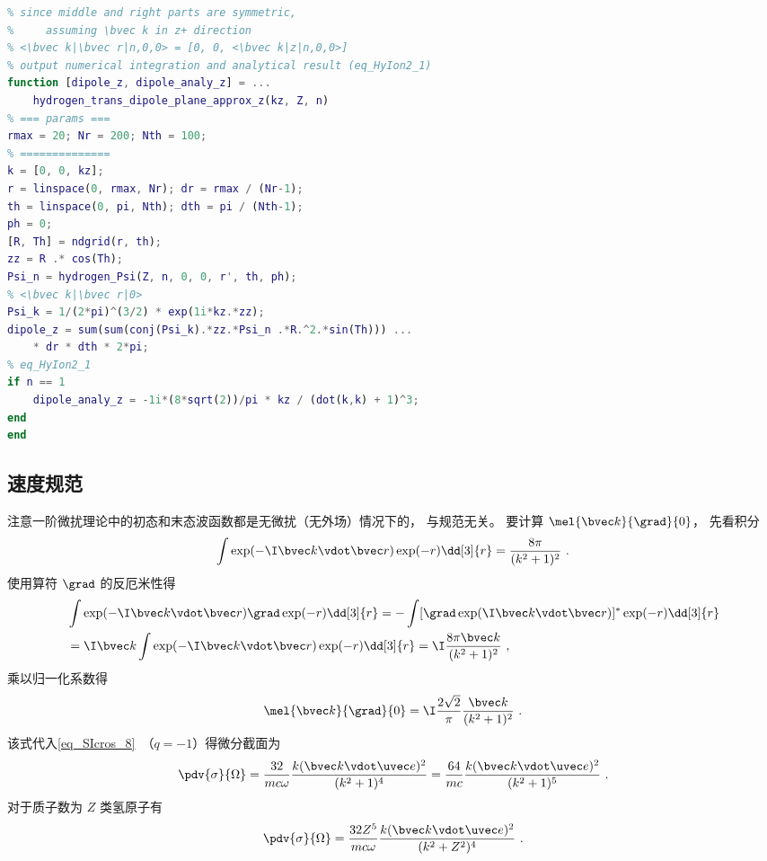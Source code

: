 \begin{lstlisting}[language=matlab, caption=hydrogen\_trans\_dipole\_plane\_approx\_z.m]
% hydrogen transition dipole, approximate Coulomb plane wave with plane wave
% since middle and right parts are symmetric,
%     assuming \bvec k in z+ direction
% <\bvec k|\bvec r|n,0,0> = [0, 0, <\bvec k|z|n,0,0>]
% output numerical integration and analytical result (eq_HyIon2_1)
function [dipole_z, dipole_analy_z] = ...
    hydrogen_trans_dipole_plane_approx_z(kz, Z, n)
% === params ===
rmax = 20; Nr = 200; Nth = 100;
% ==============
k = [0, 0, kz];
r = linspace(0, rmax, Nr); dr = rmax / (Nr-1);
th = linspace(0, pi, Nth); dth = pi / (Nth-1);
ph = 0;
[R, Th] = ndgrid(r, th);
zz = R .* cos(Th);
Psi_n = hydrogen_Psi(Z, n, 0, 0, r', th, ph);
% <\bvec k|\bvec r|0>
Psi_k = 1/(2*pi)^(3/2) * exp(1i*kz.*zz);
dipole_z = sum(sum(conj(Psi_k).*zz.*Psi_n .*R.^2.*sin(Th))) ...
    * dr * dth * 2*pi;
% eq_HyIon2_1
if n == 1
    dipole_analy_z = -1i*(8*sqrt(2))/pi * kz / (dot(k,k) + 1)^3;
end
end
\end{lstlisting}


\subsection{速度规范}
注意一阶微扰理论中的初态和末态波函数都是无微扰（无外场）情况下的， 与规范无关。 要计算 $\mel{\bvec k}{\grad}{0}$， 先看积分
\begin{equation}
\int \exp(-\I \bvec k \vdot \bvec r) \exp(-r) \dd[3]{r} = \frac{8\pi }{(k^2 + 1)^2}~.
\end{equation}
使用算符 $\grad$ 的反厄米性得
\begin{equation}
\begin{aligned}
&\int \exp(-\I \bvec k \vdot \bvec r) \grad \exp(-r) \dd[3]{r}
= -\int [\grad \exp(\I \bvec k \vdot \bvec r)]^* \exp(-r) \dd[3]{r}\\
&= \I \bvec k \int \exp(-\I \bvec k \vdot \bvec r) \exp(-r) \dd[3]{r}
= \I \frac{8 \pi  \bvec k}{(k^2 + 1)^2}~,
\end{aligned}
\end{equation}
乘以归一化系数得
\begin{equation}\label{eq_HyIon2_2}
\mel{\bvec k}{\grad}{0} = \I\frac{2\sqrt{2}}{\pi}\frac{\bvec k}{(k^2 + 1)^2}~.
\end{equation}
该式代入\autoref{eq_SIcros_8}~（$q = -1$）得微分截面为
\begin{equation}
\pdv{\sigma}{\Omega} = \frac{32}{mc\omega} \frac{k(\bvec k \vdot \uvec e)^2}{(k^2 + 1)^4}
= \frac{64}{mc} \frac{k(\bvec k \vdot \uvec e)^2}{(k^2 + 1)^5}~.
\end{equation}
对于质子数为 $Z$ 类氢原子有
\begin{equation}
\pdv{\sigma}{\Omega} = \frac{32 Z^5}{mc\omega} \frac{k(\bvec k \vdot \uvec e)^2}{(k^2 + Z^2)^4}~.
\end{equation}

